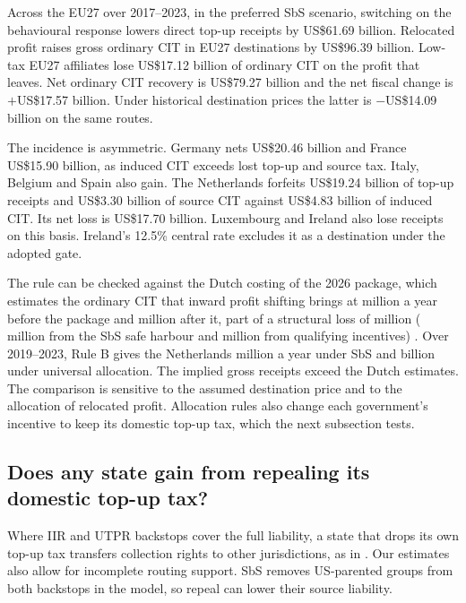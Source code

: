 \documentclass[11pt,a4paper]{article}
\newcommand{\EUR}{\texteuro}
\newcommand{\usd}{US\$}
\begin{document}
Across the EU27 over 2017–2023, in the preferred SbS scenario, switching on the behavioural response lowers direct top-up receipts by \usd61.69 billion. Relocated profit raises gross ordinary CIT in EU27 destinations by \usd96.39 billion. Low-tax EU27 affiliates lose \usd17.12 billion of ordinary CIT on the profit that leaves. Net ordinary CIT recovery is \usd79.27 billion and the net fiscal change is $+$\usd17.57 billion. Under historical destination prices the latter is $-$\usd14.09 billion on the same routes.

The incidence is asymmetric. Germany nets \usd20.46 billion and France \usd15.90 billion, as induced CIT exceeds lost top-up and source tax. Italy, Belgium and Spain also gain. The Netherlands forfeits \usd19.24 billion of top-up receipts and \usd3.30 billion of source CIT against \usd4.83 billion of induced CIT. Its net loss is \usd17.70 billion. Luxembourg and Ireland also lose receipts on this basis. Ireland’s 12.5\% central rate excludes it as a destination under the adopted gate.

The rule can be checked against the Dutch costing of the 2026 package, which estimates the ordinary CIT that inward profit shifting brings at \EUR451 million a year before the package and \EUR397 million after it, part of a structural loss of \EUR108 million (\EUR73 million from the SbS safe harbour and \EUR35 million from qualifying incentives) \citep{37025_6}. Over 2019–2023, Rule B gives the Netherlands \EUR628 million a year under SbS and \EUR1.012 billion under universal allocation. The implied gross receipts exceed the Dutch estimates. The comparison is sensitive to the assumed destination price and to the allocation of relocated profit. Allocation rules also change each government's incentive to keep its domestic top-up tax, which the next subsection tests.

\subsection{Does any state gain from repealing its domestic top-up tax?}\label{sec:repeal_game}

Where IIR and UTPR backstops cover the full liability, a state that drops its own top-up tax transfers collection rights to other jurisdictions, as in \citet{devereux2022}. Our estimates also allow for incomplete routing support. SbS removes US-parented groups from both backstops in the model, so repeal can lower their source liability.
\end{document}
